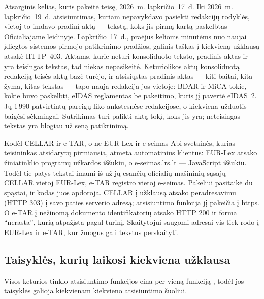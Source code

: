 \begin{lessonbox}{Atsarginis kelias, kuris pakeitė teisę, 2026~m. lapkričio~17~d.}
Iki 2026~m. lapkričio~19~d. atsisiuntimas, kuriam nepavykdavo pasiekti redakcijų rodyklės,
vietoj to imdavo pradinį aktą --- tekstą, koks jis pirmą kartą paskelbtas Oficialiajame
leidinyje. Lapkričio~17~d., praėjus kelioms minutėms nuo naujai įdiegtos sistemos pirmojo
patikrinimo pradžios, galinis taškas į kiekvieną užklausą atsakė HTTP~403. Aktams, kurie
neturi konsoliduoto teksto, pradinis aktas ir yra teisingas tekstas, tad niekas nepasikeitė.
Keturiolikos aktų konsoliduotą redakciją teisės aktų bazė turėjo, ir atsisiųstas pradinis
aktas --- kiti baitai, kita žyma, kitas tekstas --- tapo nauja redakcija jos vietoje: BDAR ir
MiCA tokie, kokie buvo paskelbti, eIDAS reglamentas be pakeitimo, kuris jį pavertė eIDAS~2.
Jų 1\,990 patvirtintų pareigų liko ankstesnėse redakcijose, o kiekviena užduotis baigėsi
sėkmingai. Sutrikimas turi palikti aktą tokį, koks jis yra; neteisingas tekstas yra blogiau
už seną patikrinimą.
\end{lessonbox}

\begin{lessonbox}{Kodėl CELLAR ir e-TAR, o ne EUR-Lex ir e-seimas}
Abi svetainės, kurias teisininkas atsidarytų pirmiausia, atmeta automatinius klientus:
EUR-Lex atsako žiniatinklio programų užkardos iššūkiu, o e-seimas.lrs.lt --- JavaScript
iššūkiu. Todėl tie patys tekstai imami iš už jų esančių oficialių mašininių sąsajų ---
CELLAR vietoj EUR-Lex, e-TAR registro vietoj e-seimas. Pakeliui pasitaikė du spąstai, ir kodas
juos apdoroja. CELLAR į užklausą atsako peradresavimu (HTTP 303) į savo paties serverio
 adresą; atsisiuntimo funkcija jį pakeičia į https. O e-TAR į nežinomą dokumento
identifikatorių atsako HTTP 200 ir forma \enquote{nerasta}, kurią 
atpažįsta pagal turinį. Skaitytojui saugomi adresai vis tiek rodo į EUR-Lex ir e-TAR, kur
žmogus gali tekstus perskaityti.
\end{lessonbox}

\subsection{Taisyklės, kurių laikosi kiekviena užklausa}\label{sec:corpus:egress}

Visos keturios tinklo atsisiuntimo funkcijos eina per vieną funkciją , todėl jos
taisyklės galioja kiekvienam kiekvieno atsisiuntimo šuoliui.

